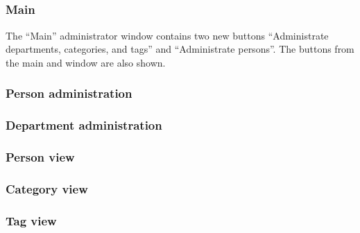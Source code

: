 \subsection{\ainterface}
\label{sec:admininterface}

\subsubsection{Main}
The ``Main'' administrator window contains two new buttons ``Administrate departments, categories, and tags'' and ``Administrate persons''. The buttons from the main \astaff and \aclient window are also shown.  

\subsubsection{Person administration}

\subsubsection{Department administration}

\subsubsection{Person view}

\subsubsection{Category view}

\subsubsection{Tag view}

